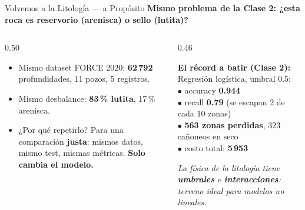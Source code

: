 \documentclass[aspectratio=169, 11pt]{beamer}
\begin{document}
\begin{frame}[shrink=8]{Volvemos a la Litología --- a Propósito}
  \vspace{-4pt}
  {\small\color{arcaDark}\bfseries
    Mismo problema de la Clase 2: ¿esta roca es \textbf{reservorio} (arenisca) o \textbf{sello} (lutita)?}

  \vspace{6pt}
  \begin{columns}[T]
    \begin{column}{0.50\textwidth}
      {\footnotesize\color{textMuted}
      \begin{itemize}\setlength{\itemsep}{6pt}
        \item[{\color{arcaRed}\scriptsize\faDatabase}]
          Mismo dataset FORCE 2020: \textbf{62\,792} profundidades,
          11 pozos, 5 registros.
        \item[{\color{arcaRed}\scriptsize\faBalanceScale}]
          Mismo desbalance: \textbf{83\,\% lutita}, 17\,\% arenisca.
        \item[{\color{codeGreen}\scriptsize\faCheck}]
          ¿Por qué repetirlo? Para una comparación
          \textbf{justa}: mismos datos, mismo test, mismas
          métricas. \textbf{Solo cambia el modelo.}
      \end{itemize}
      }
    \end{column}
    \begin{column}{0.46\textwidth}
      \begin{tcolorbox}[colback=arcaGray, colframe=arcaRed, boxrule=0pt, leftrule=3pt,
        arc=3pt, left=6pt, right=6pt, top=5pt, bottom=5pt]
        {\scriptsize\color{arcaDark}\bfseries El récord a batir (Clase 2):}\\[5pt]
        {\scriptsize\color{textMuted}
          Regresión logística, umbral 0.5:\\[2pt]
          \(\bullet\) accuracy \textbf{0.944}\\
          \(\bullet\) recall \textbf{0.79} (se escapan 2 de cada 10 zonas)\\
          \(\bullet\) \textbf{563 zonas perdidas}, 323 cañoneos en seco\\
          \(\bullet\) costo total: \textbf{5\,953}}
      \end{tcolorbox}
      \vspace{4pt}
      {\scriptsize\color{arcaDark}\itshape
        La física de la litología tiene \textbf{umbrales}
        e \textbf{interacciones}: terreno ideal para
        modelos no lineales.}
    \end{column}
  \end{columns}
\end{frame}
\end{document}
